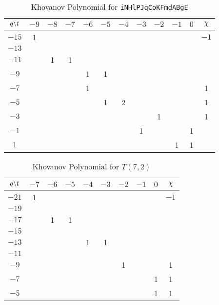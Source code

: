 \begin{table}
    \centering
    \begin{tabular}{| c | c | c | c | c | c | c | c | c | c | c | c |}
        \hline
        $q\symbol{92}t$&$-9$&$-8$&$-7$&$-6$&$-5$&$-4$&$-3$&$-2$&$-1$&$0$&$\chi$\\
        \hline
        $-15$&1&&&&&&&&&&$-1$\\
        \hline
        $-13$&&&&&&&&&&&\\
        \hline
        $-11$&&1&1&&&&&&&&\\
        \hline
        $-9$&&&&1&1&&&&&&\\
        \hline
        $-7$&&&&1&&&&&&&1\\
        \hline
        $-5$&&&&&1&2&&&&&1\\
        \hline
        $-3$&&&&&&&&1&&&1\\
        \hline
        $-1$&&&&&&&1&&&1&\\
        \hline
        $1$&&&&&&&&&1&1&\\
        \hline
    \end{tabular}
    \caption{Khovanov Polynomial for \texttt{iNHlPJqCoKFmdABgE}}
    \label{table:iNHlPJqCoKFmdABgE_kho}
\end{table}
\begin{table}
    \centering
    \begin{tabular}{| c | c | c | c | c | c | c | c | c | c |}
        \hline
        $q\symbol{92}t$&$-7$&$-6$&$-5$&$-4$&$-3$&$-2$&$-1$&$0$&$\chi$\\
        \hline
        $-21$&1&&&&&&&&$-1$\\
        \hline
        $-19$&&&&&&&&&\\
        \hline
        $-17$&&1&1&&&&&&\\
        \hline
        $-15$&&&&&&&&&\\
        \hline
        $-13$&&&&1&1&&&&\\
        \hline
        $-11$&&&&&&&&&\\
        \hline
        $-9$&&&&&&1&&&1\\
        \hline
        $-7$&&&&&&&&1&1\\
        \hline
        $-5$&&&&&&&&1&1\\
        \hline
    \end{tabular}
    \caption{Khovanov Polynomial for $T(7,2)$}
    \label{table:t_7_2_kho}
\end{table}
